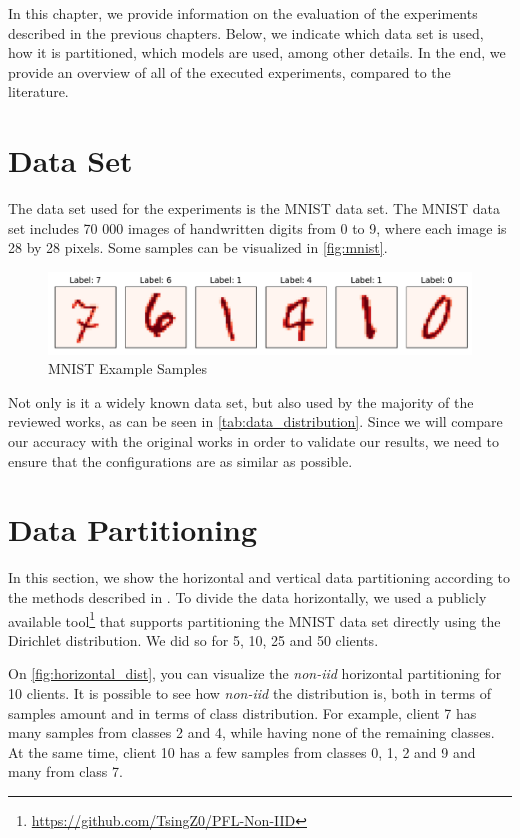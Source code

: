 In this chapter, we provide information on the evaluation of the experiments described in the previous chapters. Below, we indicate which data set is used, how it is partitioned, which models are used, among other details. In the end, we provide an overview of all of the executed experiments, compared to the literature.

\section{Data Set}

The data set used for the experiments is the MNIST\cite{lecun2010mnist} data set. The MNIST data set includes 70 000 images of handwritten digits from 0 to 9, where each image is 28 by 28 pixels. Some samples can be visualized in \autoref{fig:mnist}.

\begin{figure}[!htp]
    \centering
    \centering
    \includegraphics[width=1\textwidth]{graphics/mnist.pdf}
    \caption{MNIST Example Samples}
    \label{fig:mnist}
\end{figure}

Not only is it a widely known data set, but also used by the majority of the reviewed works, as can be seen in \autoref{tab:data_distribution}. Since we will compare our accuracy with the original works in order to validate our results, we need to ensure that the configurations are as similar as possible.

\section{Data Partitioning}

In this section, we show the horizontal and vertical data partitioning according to the methods described in . To divide the data horizontally, we used a publicly available tool\footnote{\url{https://github.com/TsingZ0/PFL-Non-IID}} that supports partitioning the MNIST data set directly using the Dirichlet distribution. We did so for 5, 10, 25 and 50 clients.

On \autoref{fig:horizontal_dist}, you can visualize the \textit{non-iid} horizontal partitioning for 10 clients. It is possible to see how \textit{non-iid} the distribution is, both in terms of samples amount and in terms of class distribution. For example, client 7 has many samples from classes 2 and 4, while having none of the remaining classes. At the same time, client 10 has a few samples from classes 0, 1, 2 and 9 and many from class 7.


